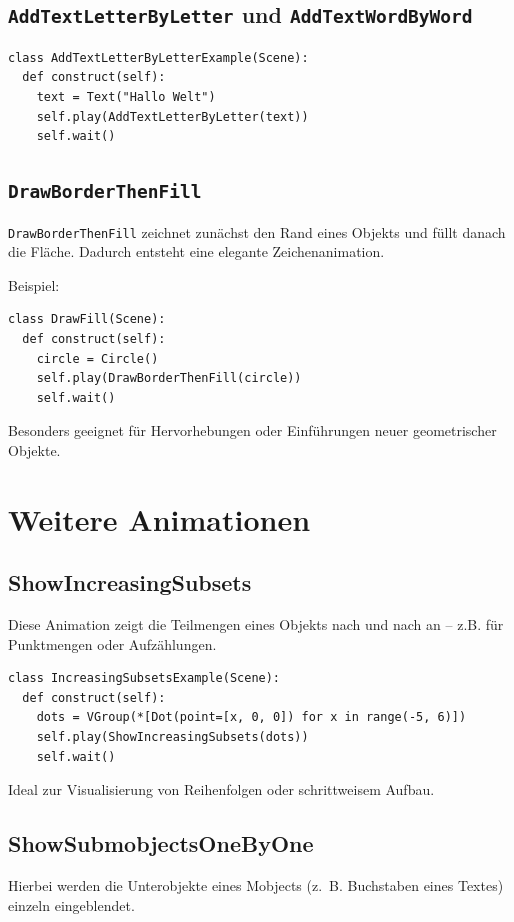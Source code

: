 \documentclass[12pt]{article}
\begin{document}
\subsection{\texttt{AddTextLetterByLetter} und \texttt{AddTextWordByWord}}

\begin{verbatim}
class AddTextLetterByLetterExample(Scene):
  def construct(self):
    text = Text("Hallo Welt")
    self.play(AddTextLetterByLetter(text))
    self.wait()
\end{verbatim}

\subsection{\texttt{DrawBorderThenFill}}
\texttt{DrawBorderThenFill} zeichnet zunächst den Rand eines Objekts und füllt danach die Fläche. Dadurch entsteht eine elegante Zeichenanimation.

Beispiel:
\begin{verbatim}
class DrawFill(Scene):
  def construct(self):
    circle = Circle()
    self.play(DrawBorderThenFill(circle))
    self.wait()
\end{verbatim}

Besonders geeignet für Hervorhebungen oder Einführungen neuer geometrischer Objekte.

\section{Weitere Animationen}

\subsection{ShowIncreasingSubsets}
Diese Animation zeigt die Teilmengen eines Objekts nach und nach an – z.B. für Punktmengen oder Aufzählungen.

\begin{verbatim}
class IncreasingSubsetsExample(Scene):
  def construct(self):
    dots = VGroup(*[Dot(point=[x, 0, 0]) for x in range(-5, 6)])
    self.play(ShowIncreasingSubsets(dots))
    self.wait()
\end{verbatim}

Ideal zur Visualisierung von Reihenfolgen oder schrittweisem Aufbau.


\subsection{ShowSubmobjectsOneByOne}
Hierbei werden die Unterobjekte eines Mobjects (z.~B. Buchstaben eines Textes) einzeln eingeblendet.
\end{document}

